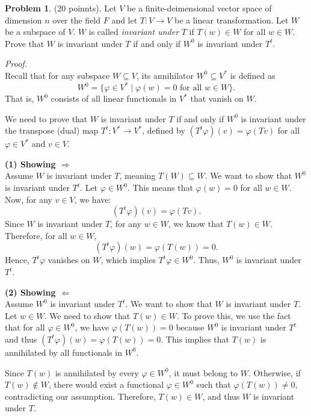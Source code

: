 \documentclass[12pt]{article}
\theoremstyle{definition}
\newtheorem{problem}{Problem}
\begin{document}
\begin{problem}(20 poinnts).
    Let $V$ be a finite-deimensional vector space of dimension $n$ over the field $F$ and let $T: V \longrightarrow V$
    be a linear transformation. Let $W$ be a subspace of $V$. $W$ is called \textit{invariant under} $T$ if $T(w) \in W$
    for all $w \in W$. Prove that $W$ is invariant under $T$ if and only if $W^0$ is invariant under $T^t$.

    \begin{solution}
        \textit{Proof.}\\
        Recall that for any subspace $W \subseteq V$, its annihilator $W^0 \subseteq V^*$ is defined as
        \[
        W^0 = \{\varphi \in V^* \mid \varphi(w) = 0 \text{ for all } w \in W\}.
        \]
        That is, $W^0$ consists of all linear functionals in $V^*$ that vanish on $W$.

        We need to prove that $W$ is invariant under $T$ if and only if $W^0$ is invariant under the transpose (dual) map $T^t: V^* \longrightarrow V^*$, defined by $(T^t \varphi)(v) = \varphi(Tv)$ for all $\varphi \in V^*$ and $v \in V$.

        \textbf{(1) Showing $\Longrightarrow$}\\
        Assume $W$ is invariant under $T$, meaning $T(W) \subseteq W$. We want to show that $W^0$ is invariant under $T^t$. Let $\varphi \in W^0$. This means that $\varphi(w) = 0$ for all $w \in W$. Now, for any $v \in V$, we have:
        \[
        (T^t \varphi)(v) = \varphi(Tv).
        \]
        Since $W$ is invariant under $T$, for any $w \in W$, we know that $T(w) \in W$. Therefore, for all $w \in W$,
        \[
        (T^t \varphi)(w) = \varphi(T(w)) = 0.
        \]
        Hence, $T^t \varphi$ vanishes on $W$, which implies $T^t \varphi \in W^0$. Thus, $W^0$ is invariant under $T^t$.

        \textbf{(2) Showing $\Longleftarrow$}\\
        Assume $W^0$ is invariant under $T^t$. We want to show that $W$ is invariant under $T$. Let $w \in W$. We need to show that $T(w) \in W$. To prove this, we use the fact that for all $\varphi \in W^0$, we have $\varphi(T(w)) = 0$ because $W^0$ is invariant under $T^t$ and thus $(T^t \varphi)(w) = \varphi(T(w)) = 0$. This implies that $T(w)$ is annihilated by all functionals in $W^0$.

        Since $T(w)$ is annihilated by every $\varphi \in W^0$, it must belong to $W$. Otherwise, if $T(w) \notin W$, there would exist a functional $\varphi \in W^0$ such that $\varphi(T(w)) \neq 0$, contradicting our assumption. Therefore, $T(w) \in W$, and thus $W$ is invariant under $T$.
    \end{solution}
\end{problem}
\end{document}
